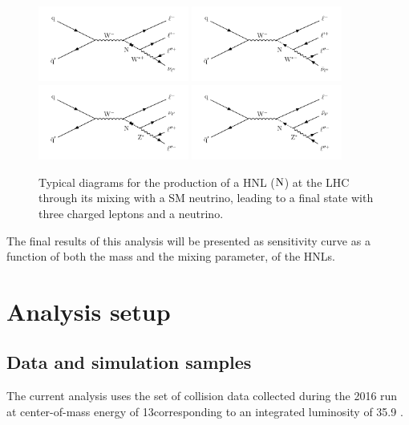 \begin{figure}[h]
\centering
\includegraphics[width=0.44\textwidth]{Figures/c5/hnl_feyn.pdf}
\includegraphics[width=0.44\textwidth]{Figures/c5/hnl_feyn_2.pdf}\\
\includegraphics[width=0.44\textwidth]{Figures/c5/hnl_z_feyn.pdf}
\includegraphics[width=0.44\textwidth]{Figures/c5/hnl_z_feyn_2.pdf}
\caption{Typical diagrams for the production of a HNL ($\mathrm{N}$)  at the LHC 
through its mixing with a SM neutrino, leading to a
final state with three charged leptons and a neutrino.}
\label{fig:c5hnldiagram}
\end{figure}

The final results of this analysis will be presented as sensitivity
curve as a function of both the mass and the mixing parameter, \mixpar
of the HNLs. 

\section{Analysis setup}
\subsection{Data and simulation samples}
The current analysis uses the set of \Pp collision data collected during the 2016 run at center-of-mass energy of 13\TeV corresponding to
an integrated luminosity of 35.9 \fbinv. 

